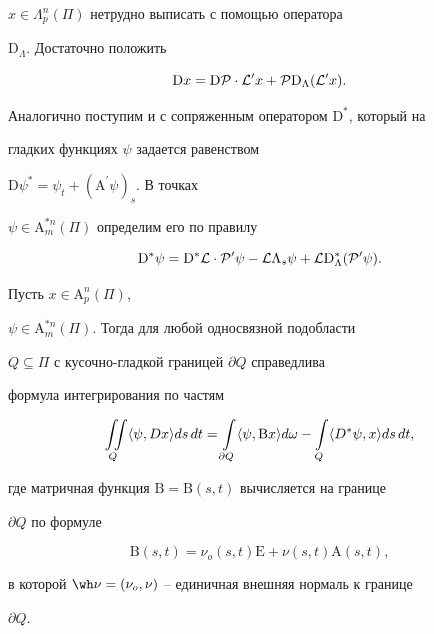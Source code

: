 $x \in \Lambda^n_{p} ({\Pi})$ нетрудно выписать с помощью оператора


$\mathrm D_{\Lambda}$. Достаточно положить 


\begin{equation}


{\mathrm D}x={\mathrm D}{\cal P} \cdot {\cal L}^{\prime} x+


{\cal P}{\mathrm D}_{\Lambda} ({\cal L}^{\prime} x).


\end{equation}


Аналогично поступим и с сопряженным оператором ${\mathrm D}^*$, который на 


гладких функциях $\psi$ задается равенством


${\mathrm D} \psi^{*}=\psi_{t}+({\mathrm A}^{\prime} \psi)_s$. В точках 


$\psi \in {\mathrm A}^{*n}_m({\Pi})$ определим его по правилу


\begin{equation}


{\mathrm D}^* \psi={\mathrm D}^* {\cal L} \cdot {\cal P}^{\prime} \psi - 


{\cal L} \Lambda_s \psi+{\cal L} {\mathrm D}^*_{\Lambda} 


({\cal P}^{\prime} \psi).


\end{equation}





\begin{thms}


Пусть $x \in {\mathrm A}^n_p ({\Pi})$,


$\psi \in {\mathrm A}^{*n}_m ({\Pi})$. Тогда для любой односвязной подобласти


$Q \subseteq \Pi$ с кусочно-гладкой границей $\partial Q$ справедлива


формула интегрирования по частям


$$


\iint\limits_{Q} 


\la\psi, Dx\ra ds\, dt=\int\limits_{\partial Q}


\la\psi, {\mathrm B} x\ra d \omega -


\int\limits_{Q} \la D^* \psi, x\ra ds\, dt,


$$ 


где матричная функция ${\mathrm B=\mathrm B}(s,t)$ вычисляется на границе 


$\partial Q$ по формуле


$$


{\mathrm B}(s,t)=\nu_o (s,t) {\mathrm E}+\nu (s,t) {\mathrm A}(s,t),


$$


в которой $\wh\nu=(\nu_o, \nu)$ -- единичная внешняя нормаль к границе 


$\partial Q$.


\end{thms}





